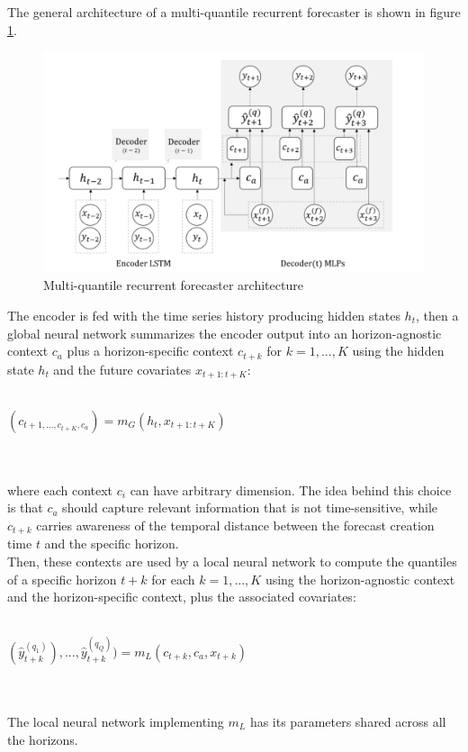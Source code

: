 \documentclass[a4paper]{article} %
\begin{document}
	The general architecture of a multi-quantile recurrent forecaster is shown in figure \ref{fig:mqforecaster}. 
	\begin{figure}
		\includegraphics[width=\linewidth]{img/mqcnn.png}
		\caption{Multi-quantile recurrent forecaster architecture}
		\label{fig:mqforecaster}
	\end{figure}
	The encoder is fed with the time series history producing hidden states $h_t$,  then a global neural network summarizes the encoder output into an horizon-agnostic context $c_a$ plus a horizon-specific context $c_{t+k}$ for $k=1,...,K$ using the hidden state $h_t$ and the future covariates $x_{t+1:t+K}$:\\\\
	\centerline{
	$
	(c_{t+1, ..., c_{t+K}, c_a}) = m_G(h_t, x_{t+1:t+K})
	$
	}\\\\
	where each context $c_i$ can have arbitrary dimension. The idea behind this choice is that $c_a$ should capture relevant information that is not time-sensitive, while $c_{t+k}$ carries awareness of the temporal distance between the forecast creation time $t$ and the specific horizon.\\ 
	Then, these contexts are used by a local neural network to compute the quantiles of a specific horizon $t+k$ for each $k=1,...,K$ using the horizon-agnostic context and the horizon-specific context, plus the associated covariates:\\\\
	\centerline{
	$
	(\hat{y}_{t+k}^{(q_1)}), ..., \hat{y}_{t+k}^{(q_Q)}) = m_L(c_{t+k}, c_a, x_{t+k})
	$
	}\\\\
	The local neural network implementing $m_L$ has its parameters shared across all the horizons.
	
\end{document}
